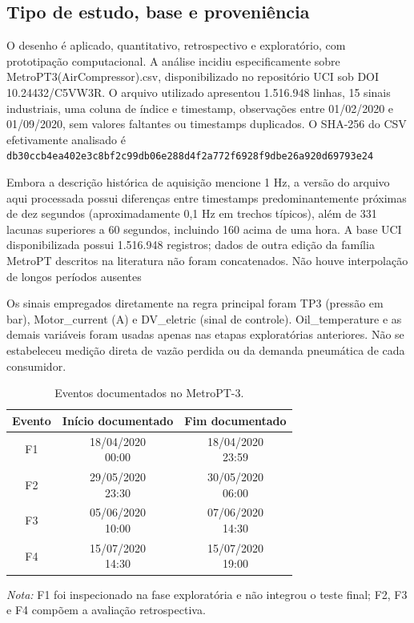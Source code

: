 \documentclass[conference]{IEEEtran}
\begin{document}
\subsection{Tipo de estudo, base e proveniência}

O desenho é aplicado, quantitativo, retrospectivo e exploratório, com prototipação computacional. A análise incidiu especificamente sobre MetroPT3(AirCompressor).csv, disponibilizado no repositório UCI sob DOI 10.24432/C5VW3R. O arquivo utilizado apresentou 1.516.948 linhas, 15 sinais industriais, uma coluna de índice e timestamp, observações entre 01/02/2020 e 01/09/2020, sem valores faltantes ou timestamps duplicados. O SHA-256 do CSV efetivamente analisado é \nolinkurl{db30ccb4ea402e3c8bf2c99db06e288d4f2a772f6928f9dbe26a920d69793e24}~\cite{davari2021metropt3}

Embora a descrição histórica de aquisição mencione 1 Hz, a versão do arquivo aqui processada possui diferenças entre timestamps predominantemente próximas de dez segundos (aproximadamente 0,1 Hz em trechos típicos), além de 331 lacunas superiores a 60 segundos, incluindo 160 acima de uma hora. A base UCI disponibilizada possui 1.516.948 registros; dados de outra edição da família MetroPT descritos na literatura não foram concatenados. Não houve interpolação de longos períodos ausentes \cite{davari2021metropt3,veloso2022metropt}

Os sinais empregados diretamente na regra principal foram TP3 (pressão em bar), Motor\_current (A) e DV\_eletric (sinal de controle). Oil\_temperature e as demais variáveis foram usadas apenas nas etapas exploratórias anteriores. Não se estabeleceu medição direta de vazão perdida ou da demanda pneumática de cada consumidor.

\begin{table}[!t]
\centering
\caption{Eventos documentados no MetroPT-3.}
\label{tab:1}
\footnotesize
\setlength{\tabcolsep}{3.5pt}
\renewcommand{\arraystretch}{1.12}
\begin{tabular}{@{}c c c@{}}
\toprule
\textbf{Evento} & \textbf{Início documentado} & \textbf{Fim documentado} \\
\midrule
F1 & \shortstack{18/04/2020\\00:00} & \shortstack{18/04/2020\\23:59} \\
F2 & \shortstack{29/05/2020\\23:30} & \shortstack{30/05/2020\\06:00} \\
F3 & \shortstack{05/06/2020\\10:00} & \shortstack{07/06/2020\\14:30} \\
F4 & \shortstack{15/07/2020\\14:30} & \shortstack{15/07/2020\\19:00} \\
\bottomrule
\end{tabular}
\vspace{2pt}
\parbox{\columnwidth}{\raggedright\scriptsize\textit{Nota:} F1 foi inspecionado na fase exploratória e não integrou o teste final; F2, F3 e F4 compõem a avaliação retrospectiva.}
\end{table}
\end{document}
